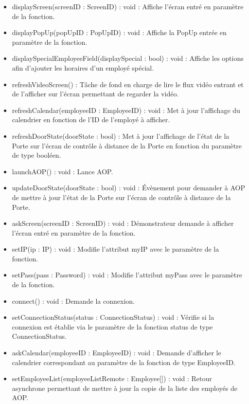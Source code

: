             \begin{itemize}
                \item displayScreen(screenID : ScreenID) : void : Affiche l'écran entré en paramètre de la fonction.
                \item displayPopUp(popUpID : PopUpID) : void : Affiche la PopUp entrée en paramètre de la fonction.
                \item displaySpecialEmployeeField(displaySpecial : bool) : void : Affiche les options afin d'ajouter les horaires d'un employé spécial.
                \item refreshVideoScreen() : Tâche de fond en charge de lire le flux vidéo entrant et de l'afficher sur l'écran permettant de regarder la vidéo.
                \item refreshCalendar(employeeID : EmployeeID) : void : Met à jour l'affichage du calendrier en fonction de l'ID de l'employé à afficher.
                \item refreshDoorState(doorState : bool) : Met à jour l'affichage de l'état de la Porte sur l'écran de contrôle à distance de la Porte en fonction du paramètre de type booléen.
                \item launchAOP() : void : Lance AOP.
                \item updateDoorState(doorState : bool) : void : Évènement pour demander à AOP de mettre à jour l'état de la Porte sur l'écran de contrôle à distance de la Porte.
                \item askScreen(screenID : ScreenID) : void : Démonstrateur demande à afficher l'écran entré en paramètre de la fonction.
                \item setIP(ip : IP) : void : Modifie l’attribut myIP avec le paramètre de la fonction.
                \item setPass(pass : Password) : void : Modifie l’attribut myPass avec le paramètre de la fonction.
                \item connect() : void : Demande la connexion.
                \item setConnectionStatus(status : ConnectionStatus) : void : Vérifie si la connexion est établie via le paramètre de la fonction status de type ConnectionStatus.
                \item askCalendar(employeeID : EmployeeID) : void : Demande d'afficher le calendrier correspondant au paramètre de la fonction de type EmployeeID.
                \item setEmployeeList(employeeListRemote : Employee[]) : void : Retour asynchrone permettant de mettre à jour la copie de la liste des employés de AOP.

\end{itemize}
